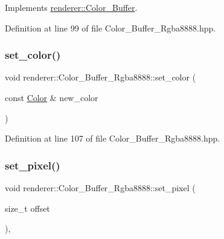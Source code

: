 Implements \mbox{\hyperlink{classrenderer_1_1_color___buffer_ac99a897d15211d3754e343928412b765}{renderer\+::\+Color\+\_\+\+Buffer}}.



Definition at line 99 of file Color\+\_\+\+Buffer\+\_\+\+Rgba8888.\+hpp.

\mbox{\label{classrenderer_1_1_color___buffer___rgba8888_a8b44a3ddba4d34dfed253634d75018a5}} 
\subsubsection{\texorpdfstring{set\_color()}{set\_color()}\hspace{0.1cm}{\footnotesize\ttfamily [2/2]}}
{\footnotesize\ttfamily void renderer\+::\+Color\+\_\+\+Buffer\+\_\+\+Rgba8888\+::set\+\_\+color (\begin{DoxyParamCaption}\item[{const \mbox{\hyperlink{structrenderer_1_1_color___buffer___rgba8888_1_1_color}{Color}} \&}]{new\+\_\+color }\end{DoxyParamCaption})\hspace{0.3cm}{\ttfamily [inline]}}



Definition at line 107 of file Color\+\_\+\+Buffer\+\_\+\+Rgba8888.\+hpp.

\mbox{\label{classrenderer_1_1_color___buffer___rgba8888_a99589bff538769aa5b0923274dc324cb}} 
\subsubsection{\texorpdfstring{set\_pixel()}{set\_pixel()}\hspace{0.1cm}{\footnotesize\ttfamily [1/2]}}
{\footnotesize\ttfamily void renderer\+::\+Color\+\_\+\+Buffer\+\_\+\+Rgba8888\+::set\+\_\+pixel (\begin{DoxyParamCaption}\item[{size\+\_\+t}]{offset }\end{DoxyParamCaption})\hspace{0.3cm}{\ttfamily [inline]}, {\ttfamily [virtual]}}



